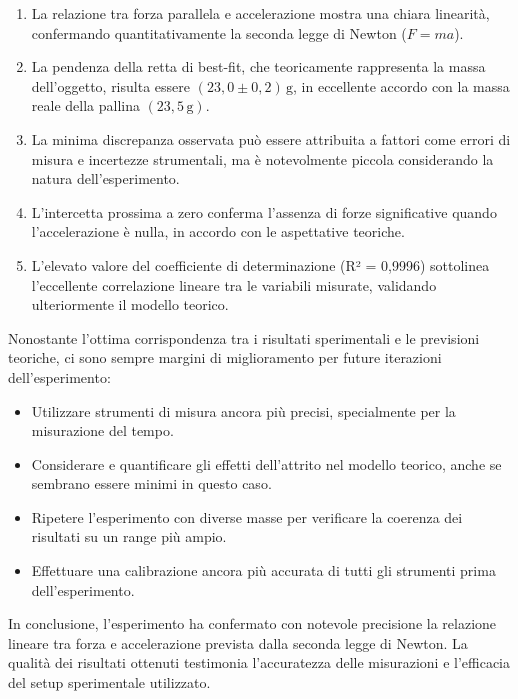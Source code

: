 \documentclass[12pt,a4paper,oneside]{book}
\theoremstyle{esercizio}
\begin{document}
\begin{enumerate}
    \item La relazione tra forza parallela e accelerazione mostra una chiara linearità, confermando quantitativamente la seconda legge di Newton ($F = ma$).
    
    \item La pendenza della retta di best-fit, che teoricamente rappresenta la massa dell'oggetto, risulta essere $(23,0 \pm 0,2) \, \text{g}$, in eccellente accordo con la massa reale della pallina $(23,5 \, \text{g})$.
    
    \item La minima discrepanza osservata può essere attribuita a fattori come errori di misura e incertezze strumentali, ma è notevolmente piccola considerando la natura dell'esperimento.
    
    \item L'intercetta prossima a zero conferma l'assenza di forze significative quando l'accelerazione è nulla, in accordo con le aspettative teoriche.
    
    \item L'elevato valore del coefficiente di determinazione (R² = 0,9996) sottolinea l'eccellente correlazione lineare tra le variabili misurate, validando ulteriormente il modello teorico.
\end{enumerate}

Nonostante l'ottima corrispondenza tra i risultati sperimentali e le previsioni teoriche, ci sono sempre margini di miglioramento per future iterazioni dell'esperimento:

\begin{itemize}
    \item Utilizzare strumenti di misura ancora più precisi, specialmente per la misurazione del tempo.
    \item Considerare e quantificare gli effetti dell'attrito nel modello teorico, anche se sembrano essere minimi in questo caso.
    \item Ripetere l'esperimento con diverse masse per verificare la coerenza dei risultati su un range più ampio.
    \item Effettuare una calibrazione ancora più accurata di tutti gli strumenti prima dell'esperimento.
\end{itemize}

In conclusione, l'esperimento ha confermato con notevole precisione la relazione lineare tra forza e accelerazione prevista dalla seconda legge di Newton. La qualità dei risultati ottenuti testimonia l'accuratezza delle misurazioni e l'efficacia del setup sperimentale utilizzato.
\end{document}

